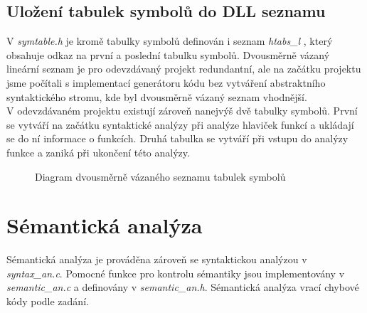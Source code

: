 \documentclass[a4paper, 12pt]{article}
\begin{document}
\newpage

\subsection{Uložení tabulek symbolů do DLL seznamu}
V \textit{symtable.h} je kromě tabulky symbolů definován i seznam \textit{htabs\_l }, který obsahuje odkaz na první a poslední tabulku symbolů. Dvousměrně vázaný lineární seznam je pro odevzdávaný projekt redundantní, ale na začátku projektu jsme počítali s implementací generátoru kódu bez vytváření abstraktního syntaktického stromu, kde byl dvousměrně vázaný seznam vhodnější.\\
\newline
V odevzdávaném projektu existují zároveň nanejvýš dvě tabulky symbolů. První se vytváří na začátku syntaktické analýzy při analýze hlaviček funkcí a ukládají se do ní informace o funkcích. 
\newline
Druhá tabulka se vytváří při vstupu do analýzy funkce a zaniká při ukončení této analýzy.
\vspace{4cm}

\begin{figure}[ht!]
\begin{center}


\caption{Diagram dvousměrně vázaného seznamu tabulek symbolů}
\end{center}
\end{figure}
\vspace{4cm}

\section{Sémantická analýza}
Sémantická analýza je prováděna zároveň se syntaktickou analýzou v \textit{syntax\_an.c}. Pomocné funkce pro kontrolu sémantiky jsou implementovány v \textit{semantic\_an.c} a definovány v \textit{semantic\_an.h}. Sémantická analýza vrací chybové kódy podle zadání.
\end{document}
